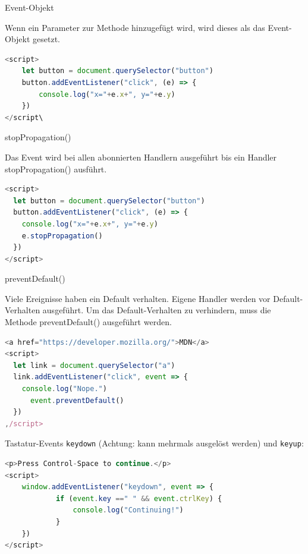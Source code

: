 \begin{code}{Event-Objekt}

Wenn ein Parameter zur Methode hinzugefügt wird, wird dieses als das Event-Objekt gesetzt.
\begin{lstlisting}[language=JavaScript, style=basesmol]
<script>
    let button = document.querySelector("button")
    button.addEventListener("click", (e) => {
        console.log("x="+e.x+", y="+e.y)
    })
</script\
\end{lstlisting}
\end{code}

\begin{examplecode}{stopPropagation()}

Das Event wird bei allen abonnierten Handlern ausgeführt bis ein Handler stopPropagation() ausführt.
\begin{lstlisting}[language=JavaScript, style=basesmol]
<script>
  let button = document.querySelector("button")
  button.addEventListener("click", (e) => {
    console.log("x="+e.x+", y="+e.y)
    e.stopPropagation()
  })
</script>
\end{lstlisting}
\end{examplecode}

\begin{examplecode}{preventDefault()}

Viele Ereignisse haben ein Default verhalten. Eigene Handler werden vor Default-Verhalten ausgeführt. Um das Default-Verhalten zu verhindern, muss die Methode preventDefault() ausgeführt werden.
\begin{lstlisting}[language=JavaScript, style=basesmol]
<a href="https://developer.mozilla.org/">MDN</a>
<script>
  let link = document.querySelector("a")
  link.addEventListener("click", event => {
    console.log("Nope.")
      event.preventDefault()
  })
,/script>
\end{lstlisting}
\end{examplecode}

\begin{definition}{Tastatur-Events}
\texttt{keydown} (Achtung: kann mehrmals ausgelöst werden) und \texttt{keyup}:
\begin{lstlisting}[language=JavaScript, style=basesmol]
<p>Press Control-Space to continue.</p>
<script>
    window.addEventListener("keydown", event => {
            if (event.key ==" " && event.ctrlKey) {
                console.log("Continuing!")
            }
    })
</script>
\end{lstlisting}
\end{definition}

